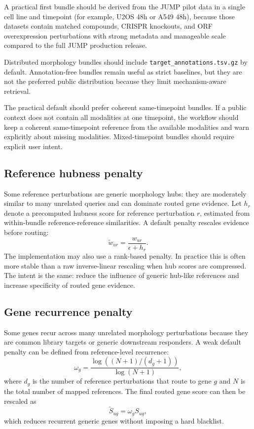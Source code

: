 \documentclass[11pt]{article}
\begin{document}
A practical first bundle should be derived from the JUMP pilot data in a single cell line and timepoint (for example, U2OS 48h or A549 48h), because those datasets contain matched compounds, CRISPR knockouts, and ORF overexpression perturbations with strong metadata and manageable scale compared to the full JUMP production release. \cite{jump_gallery,jump_pilot,jump_target}

Distributed morphology bundles should include \texttt{target\_annotations.tsv.gz} by default. Annotation-free bundles remain useful as strict baselines, but they are not the preferred public distribution because they limit mechanism-aware retrieval.

The practical default should prefer coherent same-timepoint bundles. If a public context does not contain all modalities at one timepoint, the workflow should keep a coherent same-timepoint reference from the available modalities and warn explicitly about missing modalities. Mixed-timepoint bundles should require explicit user intent.

\subsection{Reference hubness penalty}
Some reference perturbations are generic morphology hubs: they are moderately similar to many unrelated queries and can dominate routed gene evidence. Let $h_r$ denote a precomputed hubness score for reference perturbation $r$, estimated from within-bundle reference-reference similarities. A default penalty rescales evidence before routing:
\[
\tilde{w}_{ur} = \frac{w_{ur}}{\epsilon + h_r}.
\]
The implementation may also use a rank-based penalty. In practice this is often more stable than a raw inverse-linear rescaling when hub scores are compressed. The intent is the same: reduce the influence of generic hub-like references and increase specificity of routed gene evidence.

\subsection{Gene recurrence penalty}
Some genes recur across many unrelated morphology perturbations because they are common library targets or generic downstream responders. A weak default penalty can be defined from reference-level recurrence:
\[
\omega_g = \frac{\log((N+1)/(d_g+1))}{\log(N+1)},
\]
where $d_g$ is the number of reference perturbations that route to gene $g$ and $N$ is the total number of mapped references. The final routed gene score can then be rescaled as
\[
\tilde{S}_{ug} = \omega_g S_{ug},
\]
which reduces recurrent generic genes without imposing a hard blacklist.
\end{document}
